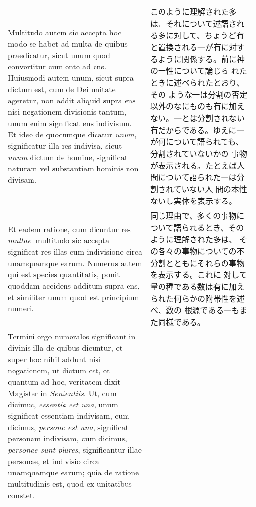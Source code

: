 \documentclass[10pt]{jsarticle} %
\begin{document}
\begin{longtable}{p{21em}p{21em}}
\\


Multitudo autem sic
accepta hoc modo se habet ad multa de quibus praedicatur, sicut unum
quod convertitur cum ente ad ens. Huiusmodi autem unum, sicut supra
dictum est, cum de Dei unitate ageretur, non addit aliquid supra ens
nisi negationem divisionis tantum, unum enim significat ens
indivisum. Et ideo de quocumque dicatur {\itshape unum}, significatur illa res
indivisa, sicut {\itshape unum} dictum de homine, significat naturam vel
substantiam hominis non divisam. 



&

このように理解された多は、それについて述語される多に対して、ちょうど有
 と置換される一が有に対するように関係する。前に神の一性について論じら
 れたときに述べられたとおり、その
 ような一は分割の否定以外のなにものも有に加えない。一とは分割されない
 有だからである。ゆえに一が何について語られても、分割されていないかの
 事物が表示される。たとえば人間について語られた一は分割されていない人
 間の本性ないし実体を表示する。


\\



Et eadem ratione, cum dicuntur res
{\itshape multae}, multitudo sic accepta significat res illas cum indivisione
circa unamquamque earum. Numerus autem qui est species quantitatis,
ponit quoddam accidens additum supra ens, et similiter unum quod est
principium numeri. 



&

同じ理由で、多くの事物について語られるとき、そのように理解された多は、
 その各々の事物についての不分割とともにそれらの事物を表示する。これに
 対して量の種である数は有に加えられた何らかの附帯性を述べ、数の
 根源である一もまた同様である。


\\


Termini ergo numerales significant in divinis illa
de quibus dicuntur, et super hoc nihil addunt nisi negationem, ut
dictum est, et quantum ad hoc, veritatem dixit Magister in
{\itshape Sententiis}. Ut, cum dicimus, {\itshape essentia est una}, unum significat
essentiam indivisam, cum dicimus, {\itshape persona est una}, significat personam
indivisam, cum dicimus, {\itshape personae sunt plures}, significantur illae
personae, et indivisio circa unamquamque earum; quia de ratione
multitudinis est, quod ex unitatibus constet.

&


\end{longtable}
\end{document}
